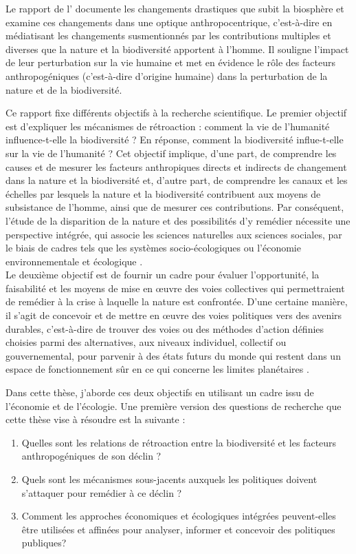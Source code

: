 Le rapport de l'\cite{ipbes_2022_6417333} documente les changements drastiques que subit la biosphère et examine ces changements dans une optique anthropocentrique, c'est-à-dire en médiatisant les changements susmentionnés par les contributions multiples et diverses que la nature et la biodiversité apportent à l'homme. Il souligne l'impact de leur perturbation sur la vie humaine et met en évidence le rôle des facteurs anthropogéniques (c'est-à-dire d'origine humaine) dans la perturbation de la nature et de la biodiversité. 
 
Ce rapport fixe différents objectifs à la recherche scientifique. Le premier objectif est d'expliquer les mécanismes de rétroaction : comment la vie de l'humanité influence-t-elle la biodiversité ? En réponse, comment la biodiversité influe-t-elle sur la vie de l'humanité ? Cet objectif implique, d'une part, de comprendre les causes et de mesurer les facteurs anthropiques directs et indirects de changement dans la nature et la biodiversité et, d'autre part, de comprendre les canaux et les échelles par lesquels la nature et la biodiversité contribuent aux moyens de subsistance de l'homme, ainsi que de mesurer ces contributions. Par conséquent, l'étude de la disparition de la nature et des possibilités d'y remédier nécessite une perspective intégrée, qui associe les sciences naturelles aux sciences sociales, par le biais de cadres tels que les systèmes socio-écologiques \citep{Ostrom2009} ou l'économie environnementale et écologique \citep{daly_ecological_2007}. 
\\
Le deuxième objectif est de fournir un cadre pour évaluer l'opportunité, la faisabilité et les moyens de mise en œuvre des voies collectives qui permettraient de remédier à la crise à laquelle la nature est confrontée. D'une certaine manière, il s'agit de concevoir et de mettre en œuvre des voies politiques vers des avenirs durables, c'est-à-dire de trouver des voies ou des méthodes d'action définies choisies parmi des alternatives, aux niveaux individuel, collectif ou gouvernemental, pour parvenir à des états futurs du monde qui restent dans un espace de fonctionnement sûr en ce qui concerne les limites planétaires \citep{rockstrom2009safe,steffen_2015_planetary}.

Dans cette thèse, j'aborde ces deux objectifs en utilisant un cadre issu de l'économie et de l'écologie. Une première version des questions de recherche que cette thèse vise à résoudre est la suivante : 

\begin{enumerate}
\item Quelles sont les relations de rétroaction entre la biodiversité et les facteurs anthropogéniques de son déclin ? 
\item Quels sont les mécanismes sous-jacents auxquels les politiques doivent s'attaquer pour remédier à ce déclin ?
\item Comment les approches économiques et écologiques intégrées peuvent-elles être utilisées et affinées pour analyser, informer et concevoir des politiques publiques? 
\end{enumerate}

